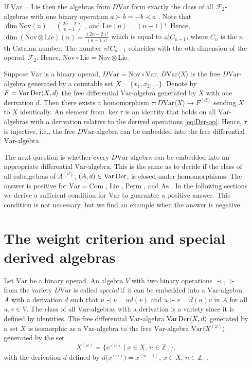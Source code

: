 \documentclass[11pt]{article}
\numberwithin{equation}{section}
\numberwithin{equation}{section}
\def\Var{\mathrm{Var}}
\def\Nov{\mathrm{Nov}}
\def\Com{\mathrm{Com}}
\def\As{\mathrm{As}}
\def\Lie{\mathrm{Lie}}
\def\Perm{\mathrm{Perm}}
\def\Der {\mathop {\fam 0 Der}\nolimits}
\begin{document}
If $\Var = \Lie $ then the algebras from $D\Var $ form exactly the class of
all $\mathcal F_2$-algebras with one binary operation $a\succ b = -b\prec a$ \cite{KSO2019}.
Note that $\dim \Nov(n) = \binom{2n-2}{n-1}$ \cite{Dzhumad-codimgrowth}, and $\Lie(n)=(n-1)!$.
Hence,
$\dim (\Nov\otimes \Lie)(n) = \frac{(2n-2)!}{(n-1)!}$ which is equal
to $n!C_{n-1}$, where $C_n$ is the $n$th Catalan number.
The number $n!C_{n-1}$ coincides with the $n$th dimension
of the operad~$\mathcal F_2$.
Hence,
$\Nov\circ \Lie = \Nov \otimes \Lie $.

Suppose $\Var $ is a binary operad, $D\Var = \Nov\circ \Var$,
$D\Var\langle X\rangle $ is the free $D\Var$-algebra generated by a countable set
$X=\{x_1,x_2,\dots \}$. Denote by $F=\Var\Der\langle X,d\rangle $ the
free differential $\Var $-algebra generated by $X$ with one derivation $d$.
Then there exists a homomorphism $\tau \colon D\Var\langle X\rangle \to F^{(d)}$
sending $X$ to $X$ identically.
An element from $\ker \tau $ is an identity that holds on all $\Var $-algebras
with a derivation relative to the derived operations \eqref{eq:Der-op}.
Hence, $\tau $ is injective, i.e., the free $D\Var$-algebra
can be embedded into the free differential $\Var $-algebra.

The next question is whether every $D\Var$-algebra can be embedded into an
appropriate differential $\Var $-algebra.
This is the same as to decide if the class of all subalgebras of $A^{(d)}$,
$(A,d)\in \Var\Der$, is closed under homomorphisms.
The answer is positive
for $\Var = \Com $ \cite{BCZ-2017}, $\Lie $ \cite{KSO2019}, $\Perm $ \cite{KS2022}, and $\As $ \cite{SK-2022}.
In the following sections we derive a sufficient condition
for $\Var $ to guarantee a positive answer. This condition is
not necessary, but we find an example when the answer is negative.


\section{The weight criterion and special derived algebras}

Let $\Var $ be a binary operad.
An algebra $V$ with two binary operations $\prec$, $\succ $ from the variety
$D\Var $ is called {\em special} if it can be embedded into
a $\Var $-algebra $A$ with a derivation $d$ such that
$u\prec v = ud(v)$ and $u\succ v = d(u)v$ in $A$ for all
$u,v\in V$.
The class of all $\Var $-algebras with a derivation is a variety
since it is defined by identities. The free differential $\Var $-algebra
$\Var\Der\langle X,d\rangle $
generated by a set $X$ is isomorphic as a $\Var$-algebra
to the free $\Var$-algebra $\Var\bigl\langle X^{(\omega )}\bigr\rangle $
generated by the set
\[
X^{(\omega )} = \bigl\{x^{(n)} \mid x\in X,\, n\in \mathbb Z_+ \bigr\},
\]
with the derivation $d$ defined by $d\bigl(x^{(n)}\bigr) = x^{(n+1)}$,
$x\in X$, $n\in \mathbb Z_+$.
\end{document}
